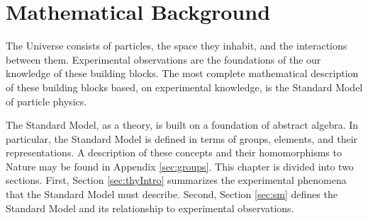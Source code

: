 \chapter{Mathematical Background}

The Universe consists of particles, the space they inhabit, and the interactions between them.
Experimental observations are the foundations of the our knowledge of these building blocks.
The most complete mathematical description of these building blocks based, on experimental knowledge, is the Standard Model of particle physics.

The Standard Model, as a theory, is built on a foundation of abstract algebra.
In particular, the Standard Model is defined in terms of groups, elements, and their representations.
A description of these concepts and their homomorphisms to Nature may be found in Appendix \ref{sec:groups}.
This chapter is divided into two sections.
First, Section \ref{sec:thyIntro} summarizes the experimental phenomena that the Standard Model must describe.
Second, Section \ref{sec:sm} defines the Standard Model and its relationship to experimental observations.





